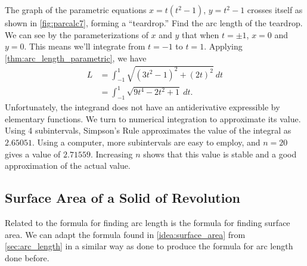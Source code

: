 \begin{example}\label{ex_parcalc7}
The graph of the parametric equations $x=t(t^2-1)$, $y=t^2-1$ crosses itself as shown in \autoref{fig:parcalc7}, forming a ``teardrop.'' Find the arc length of the teardrop.
%
\solution
We can see by the parameterizations of $x$ and $y$ that when $t=\pm 1$, $x=0$ and $y=0$. This means we'll integrate from $t=-1$ to $t=1$. Applying \autoref{thm:arc_length_parametric}, we have
\begin{align*}
L 	&= \int_{-1}^1\sqrt{(3t^2-1)^2+(2t)^2}\ dt\\
		&=	\int_{-1}^1 \sqrt{9t^4-2t^2+1} \ dt.
\end{align*}
Unfortunately, the integrand does not have an antiderivative expressible by elementary functions. We turn to numerical integration to approximate its value. Using 4 subintervals, Simpson's Rule approximates the value of the integral as $2.65051$. Using a computer, more subintervals are easy to employ, and $n=20$ gives a value of $2.71559$. Increasing $n$ shows that this value is stable and a good approximation of the actual value.
\end{example}


\subsection{Surface Area of a Solid of Revolution}

Related to the formula for finding arc length is the formula for finding surface area. We can adapt the formula found in \autoref{idea:surface_area} from \autoref{sec:arc_length} in a similar way as done to produce the formula for arc length done before.

